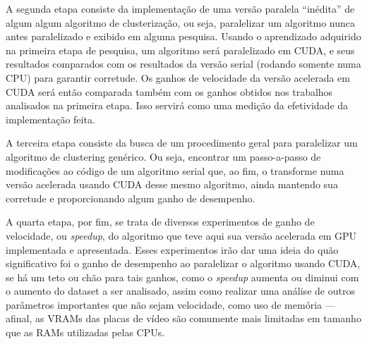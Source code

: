 \documentclass[12pt, %
openright, 
oneside, %
a4paper,    %
brazil]{facom-ufu-abntex2}
\begin{document}
A segunda etapa consiste da implementação de uma versão paralela \enquote{inédita} de algum algum algoritmo de clusterização, ou seja, paralelizar um algoritmo nunca antes paralelizado e exibido em alguma pesquisa. Usando o aprendizado adquirido na primeira etapa de pesquisa, um algoritmo será paralelizado em CUDA, e seus resultados comparados com os resultados da versão serial (rodando somente numa CPU) para garantir corretude. Os ganhos de velocidade da versão acelerada em CUDA será então comparada também com os ganhos obtidos nos trabalhos analisados na primeira etapa. Isso servirá como uma medição da efetividade da implementação feita.

A terceira etapa consiste da busca de um procedimento geral para paralelizar um algoritmo de clustering genérico. Ou seja, encontrar um passo-a-passo de modificações ao código de um algoritmo serial que, ao fim, o transforme numa versão acelerada usando CUDA desse mesmo algoritmo, ainda mantendo sua corretude e proporcionando algum ganho de desempenho.

A quarta etapa, por fim, se trata de diversos experimentos de ganho de velocidade, ou \textit{speedup}, do algoritmo que teve aqui sua versão acelerada em GPU implementada e apresentada. Esses experimentos irão dar uma ideia do quão significativo foi o ganho de desempenho ao paralelizar o algoritmo usando CUDA, se há um teto ou chão para tais ganhos, como o \textit{speedup} aumenta ou diminui com o aumento do dataset a ser analisado, assim como realizar uma análise de outros parâmetros importantes que não sejam velocidade, como uso de memória --- afinal, as VRAMs das placas de vídeo são comumente mais limitadas em tamanho que as RAMs utilizadas pelas CPUs.






\end{document}
